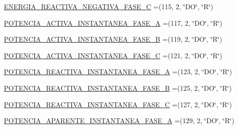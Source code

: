 \begin{DoxyCompactItemize}
\item 
\hyperlink{enumcom_1_1eneri_1_1scorpio__metertool_1_1devices_1_1_register_a3037ea31199ce9b48dd3ec26bcf55c58}{E\+N\+E\+R\+G\+I\+A\+\_\+\+R\+E\+A\+C\+T\+I\+V\+A\+\_\+\+N\+E\+G\+A\+T\+I\+V\+A\+\_\+\+F\+A\+S\+E\+\_\+C} =(115, 2, \char`\"{}DO\char`\"{}, \char`\"{}R\char`\"{})
\item 
\hyperlink{enumcom_1_1eneri_1_1scorpio__metertool_1_1devices_1_1_register_af9cfa6c1ce498db0c0a25f63806f9bc9}{P\+O\+T\+E\+N\+C\+I\+A\+\_\+\+A\+C\+T\+I\+V\+A\+\_\+\+I\+N\+S\+T\+A\+N\+T\+A\+N\+E\+A\+\_\+\+F\+A\+S\+E\+\_\+A} =(117, 2, \char`\"{}DO\char`\"{}, \char`\"{}R\char`\"{})
\item 
\hyperlink{enumcom_1_1eneri_1_1scorpio__metertool_1_1devices_1_1_register_a1572b81c44bb60f6ddf0c5146be3a865}{P\+O\+T\+E\+N\+C\+I\+A\+\_\+\+A\+C\+T\+I\+V\+A\+\_\+\+I\+N\+S\+T\+A\+N\+T\+A\+N\+E\+A\+\_\+\+F\+A\+S\+E\+\_\+B} =(119, 2, \char`\"{}DO\char`\"{}, \char`\"{}R\char`\"{})
\item 
\hyperlink{enumcom_1_1eneri_1_1scorpio__metertool_1_1devices_1_1_register_a47e2d3e62bd58a180cdb7a3a6d6cad12}{P\+O\+T\+E\+N\+C\+I\+A\+\_\+\+A\+C\+T\+I\+V\+A\+\_\+\+I\+N\+S\+T\+A\+N\+T\+A\+N\+E\+A\+\_\+\+F\+A\+S\+E\+\_\+C} =(121, 2, \char`\"{}DO\char`\"{}, \char`\"{}R\char`\"{})
\item 
\hyperlink{enumcom_1_1eneri_1_1scorpio__metertool_1_1devices_1_1_register_a47fabbcb0afe473e4e016fc494f5ad89}{P\+O\+T\+E\+N\+C\+I\+A\+\_\+\+R\+E\+A\+C\+T\+I\+V\+A\+\_\+\+I\+N\+S\+T\+A\+N\+T\+A\+N\+E\+A\+\_\+\+F\+A\+S\+E\+\_\+A} =(123, 2, \char`\"{}DO\char`\"{}, \char`\"{}R\char`\"{})
\item 
\hyperlink{enumcom_1_1eneri_1_1scorpio__metertool_1_1devices_1_1_register_a6bbdee2f5fdc30716b177b18866b16cd}{P\+O\+T\+E\+N\+C\+I\+A\+\_\+\+R\+E\+A\+C\+T\+I\+V\+A\+\_\+\+I\+N\+S\+T\+A\+N\+T\+A\+N\+E\+A\+\_\+\+F\+A\+S\+E\+\_\+B} =(125, 2, \char`\"{}DO\char`\"{}, \char`\"{}R\char`\"{})
\item 
\hyperlink{enumcom_1_1eneri_1_1scorpio__metertool_1_1devices_1_1_register_af3ec6aeba2250d68c679a3bf9e7fbf55}{P\+O\+T\+E\+N\+C\+I\+A\+\_\+\+R\+E\+A\+C\+T\+I\+V\+A\+\_\+\+I\+N\+S\+T\+A\+N\+T\+A\+N\+E\+A\+\_\+\+F\+A\+S\+E\+\_\+C} =(127, 2, \char`\"{}DO\char`\"{}, \char`\"{}R\char`\"{})
\item 
\hyperlink{enumcom_1_1eneri_1_1scorpio__metertool_1_1devices_1_1_register_aaef459eb2a64010334443a81a4df848c}{P\+O\+T\+E\+N\+C\+I\+A\+\_\+\+A\+P\+A\+R\+E\+N\+T\+E\+\_\+\+I\+N\+S\+T\+A\+N\+T\+A\+N\+E\+A\+\_\+\+F\+A\+S\+E\+\_\+A} =(129, 2, \char`\"{}DO\char`\"{}, \char`\"{}R\char`\"{})

\end{DoxyCompactItemize}
